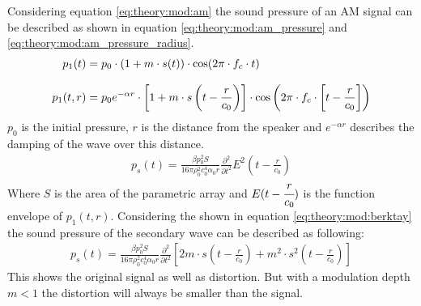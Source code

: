 Considering equation \ref{eq:theory:mod:am} the sound pressure of an AM signal can be described as shown in equation \ref{eq:theory:mod:am_pressure} and \ref{eq:theory:mod:am_pressure_radius}.
%
\begin{align}
  p_1(t) &= p_0 \cdot (1 + m \cdot s(t)) \cdot \cos (2 \pi \cdot f_c \cdot t)\label{eq:theory:mod:am_pressure}\pmath
  p_1(t, r) &= p_0 e^{- \alpha r} \cdot \left[1 + m \cdot s\left(t - \frac{r}{c_0}\right)\right] \cdot \cos \left(2 \pi \cdot f_c \cdot \left[t - \frac{r}{c_0}\right]\right)\label{eq:theory:mod:am_pressure_radius}
\end{align}
%
$p_0$ is the initial pressure, $r$ is the distance from the speaker and $e^{- \alpha r}$ describes the damping of the wave over this distance.
%
\begin{align}
  p_s(t) = \frac{\beta p_0^2 S}{16 \pi \rho_0^2 c_0^4 \alpha_0 r} \frac{\partial^2}{\partial t^2} E^2(t - \frac{r}{c_0})\label{eq:theory:mod:berktay}
\end{align}
%
Where $S$ is the area of the parametric array and $E(t - \cfrac{r}{c_0})$ is the function envelope of $p_1(t,r)$.\p
Considering the \cite[Berktay far-field solution]{bai_analysis_2012} shown in equation \ref{eq:theory:mod:berktay} the sound pressure of the secondary wave can be described as following:
%
\begin{align}
  p_s(t) = \frac{\beta p_0^2 S}{16 \pi \rho_0^2 c_0^4 \alpha_0 r} \frac{\partial^2}{\partial t^2} \left[ 2 m \cdot s\left(t - \frac{r}{c_0}\right) + m^2 \cdot s^2\left(t - \frac{r}{c_0}\right)\right]
\end{align}
%
This shows the original signal as well as distortion. But with a modulation depth $m < 1$ the distortion will always be smaller than the signal.

%
%
%
%
%

